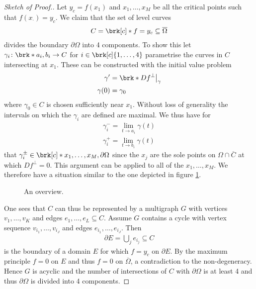 \begin{proof}[Sketch of Proof.]
  Let $y_c=f(x_1)$ and $x_1,\dots,x_M$ be all the critical points such that $f(x_\cdot)=y_c$.
  We claim that the set of level curves
  \begin{align*}
    C=\brk[c]*{f=y_c}\subseteq\overline{\Omega}
  \end{align*}
  divides the boundary $\partial\Omega$ into 4 components. To show this let $\gamma_i\colon \brk*{a_i,b_i}\to C$ for $i\in\brk[c]{1,\dots,4}$ parametrise the curves in
  $C$ intersecting at $x_1$. These can be constructed with the initial value problem
  \begin{align*} 
    \gamma'&=\brk*{Df}^\perp\big\vert_\gamma \\
    \gamma(0) &= \gamma_0
  \end{align*}
  where $\gamma_0\in C$ is chosen sufficiently near $x_1$. Without loss of generality the intervals on which the $\gamma_i$ are
  defined are maximal. We thus have for
  \begin{align*}
    \gamma_i^-=\lim_{t\to a_i}\gamma(t) \\
    \gamma_i^+=\lim_{t\to b_i}\gamma(t)
  \end{align*}
  that $\gamma_i^\pm\in\brk[c]*{x_1,\dots,x_M,\partial\Omega}$ since the $x_j$ are the sole points on $\Omega\cap\overline{C}$
  at which $Df^\perp=0$. This argument can be applied to all of the 
  $x_1,\dots,x_M$. We therefore have a situation similar to the one depicted in figure \ref{fi:n2:levelSets:overview}.
  
  \begin{figure}
    \centering
    \def\svgwidth{0.6\textwidth}
    
    \caption{An overview.}
    \label{fi:n2:levelSets:overview}
  \end{figure}

  One sees that $C$ can thus be represented by a multigraph $G$ with vertices $v_1,\dots,v_K$ and edges $e_1,\dots,e_L\subseteq C$.
  Assume $G$ contains a cycle with vertex sequence $v_{i_1},\dots,v_{i_J}$ and edges $e_{i_1},\dots,e_{i_J}$. Then
  \begin{align*}
    \partial E = \bigcup_j e_{i_j}\subseteq C
  \end{align*}
  is the boundary of a domain $E$ for which $f=y_c$ on $\partial E$. By the maximum principle $f=0$ on $E$ and thus
  $f=0$ on $\overline{\Omega}$, a contradiction to the non-degeneracy. Hence $G$ is acyclic and the number of 
  intersections of $C$ with $\partial \Omega$ is at least 4 and thus $\partial\Omega$ is divided into 4 components.
  

\end{proof}
